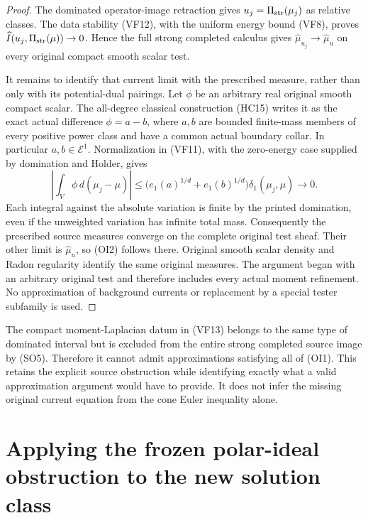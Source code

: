 \documentclass[11pt,a4paper]{article}
\numberwithin{equation}{section}
\theoremstyle{definition}
\theoremstyle{remark}
\begin{document}
\begin{proof}
The dominated operator-image retraction gives
$u_j=\Pi_{\rm str}(\mu_j)$ as relative classes.  The data
stability (VF12), with the uniform energy bound (VF8), proves
$\widehat I(u_j,\Pi_{\rm str}(\mu))\to0$.  Hence the full
strong completed calculus gives
$\widehat\mu_{u_j}\to\widehat\mu_u$ on every original
compact smooth scalar test.

It remains to identify that current limit with the prescribed
measure, rather than only with its potential-dual pairings.
Let $\phi$ be an arbitrary real original smooth compact scalar.
The all-degree classical construction (HC15) writes it as the
exact actual difference $\phi=a-b$, where $a,b$ are bounded
finite-mass members of every positive power class and have a
common actual boundary collar.  In particular $a,b\in\mathcal E^1$.
Normalization in (VF11), with the zero-energy case supplied by
domination and Holder, gives
\[
 \left|\int_V\phi\,d(\mu_j-\mu)\right|
 \leq\bigl(e_1(a)^{1/d}+e_1(b)^{1/d}\bigr)
                              \delta_1(\mu_j,\mu)\longrightarrow0.
 \tag{OI3}
\]
Each integral against the absolute variation is finite by the
printed domination, even if the unweighted variation has
infinite total mass.  Consequently the prescribed source
measures converge on the complete original test sheaf.  Their
other limit is $\widehat\mu_u$, so (OI2) follows there.
Original smooth scalar density and Radon regularity identify
the same original measures.  The argument began with an
arbitrary original test and therefore includes every actual
moment refinement.  No approximation of background currents
or replacement by a special tester subfamily is used.
\end{proof}

The compact moment-Laplacian datum in (VF13) belongs to the
same type of dominated interval but is excluded from the
entire strong completed source image by (SO5).  Therefore it
cannot admit approximations satisfying all of (OI1).  This
retains the explicit source obstruction while identifying
exactly what a valid approximation argument would have to
provide.  It does not infer the missing original current
equation from the cone Euler inequality alone.



\section{Applying the frozen polar-ideal obstruction to the new solution class}
\label{sec:r11-strict-polar-ideals}
\end{document}
